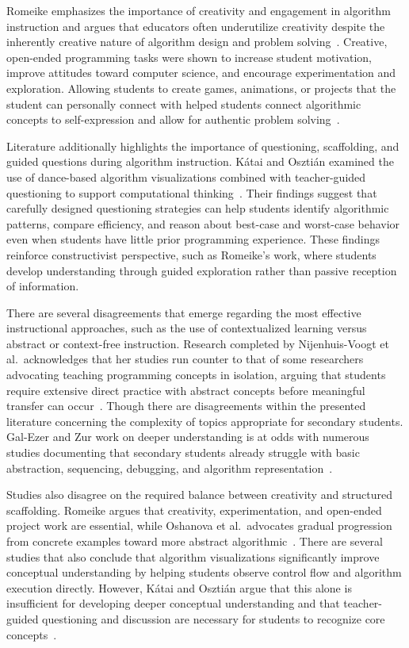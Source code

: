 Romeike emphasizes the importance of creativity and engagement in algorithm instruction and argues that educators often underutilize creativity
  despite the inherently creative nature of algorithm design and problem solving~\cite{rome2007}.
Creative, open-ended programming tasks were shown to increase student motivation, improve attitudes toward computer science, and encourage
  experimentation and exploration.
Allowing students to create games, animations, or projects that the student can personally connect with helped students connect algorithmic concepts
  to self-expression and allow for authentic problem solving~\cite{Voog2012}.

Literature additionally highlights the importance of questioning, scaffolding, and guided questions during algorithm instruction.
Kátai and Osztián examined the use of dance-based algorithm visualizations combined with teacher-guided questioning to support computational
  thinking~\cite{Zoltan2021}.
Their findings suggest that carefully designed questioning strategies can help students identify algorithmic patterns, compare efficiency, and reason
  about best-case and worst-case behavior even when students have little prior programming experience.
These findings reinforce constructivist perspective, such as Romeike's work, where students develop understanding through guided exploration rather
  than passive reception of information.

There are several disagreements that emerge regarding the most effective instructional approaches, such as the use of contextualized learning versus
  abstract or context-free instruction.
Research completed by Nijenhuis-Voogt et al.\ acknowledges that her studies run counter to that of some researchers advocating teaching programming
  concepts in isolation, arguing that students require extensive direct practice with abstract concepts before meaningful transfer can
  occur~\cite{Voog2012}.
Though there are disagreements within the presented literature concerning the complexity of topics appropriate for secondary students.
Gal-Ezer and Zur work on deeper understanding is at odds with numerous studies documenting that secondary students already struggle with basic
  abstraction, sequencing, debugging, and algorithm representation~\cite{gal2004efficiency}.

Studies also disagree on the required balance between creativity and structured scaffolding.
Romeike argues that creativity, experimentation, and open-ended project work are essential, while Oshanova et al.\ advocates gradual progression from
  concrete examples toward more abstract algorithmic~\cite{Voog2012}.
There are several studies that also conclude that algorithm visualizations significantly improve conceptual understanding by helping students observe
  control flow and algorithm execution directly.
However, Kátai and Osztián argue that this alone is insufficient for developing deeper conceptual understanding and that teacher-guided questioning
  and discussion are necessary for students to recognize core concepts~\cite{Zoltan2021}.

